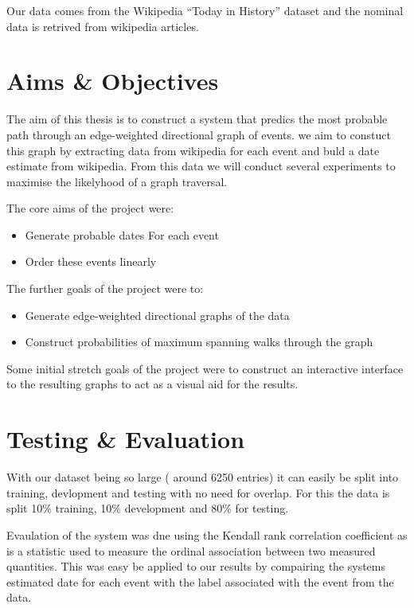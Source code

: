 \documentclass[bsc,frontabs,twoside,singlespacing,parskip,deptreport]{infthesis}     %
\begin{document}
Our data comes from the Wikipedia ``Today in History'' dataset and the nominal data is retrived
from wikipedia articles.

\section{Aims \& Objectives}
The aim of this thesis is to construct a system that predics the most probable path
through an edge-weighted directional graph of events.
we aim to constuct this graph by extracting data from wikipedia for each event and
buld a date estimate from wikipedia. From this data we will conduct several experiments
to maximise the likelyhood of a graph traversal.


The core aims of the project were: 
\begin{itemize}
  \item Generate probable dates For each event
  \item Order these events linearly
\end{itemize}

The further goals of the project were to:
\begin{itemize}
  \item Generate edge-weighted directional graphs of the data
  \item Construct probabilities of maximum spanning walks through the graph
\end{itemize}

Some initial stretch goals of the project were to construct an interactive
interface to the resulting graphs to act as a visual aid for the results.

\section{Testing \& Evaluation}
With our dataset being so large ( around 6250 entries) it can
easily be split into training, devlopment and testing with no
need for overlap. For this the data is split 10\% training,
10\% development and 80\% for testing.

Evaulation of the system was dne using the
Kendall rank correlation coefficient as is a statistic
used to measure the ordinal association between two
measured quantities. This was easy be applied to our results
by compairing the systems estimated date for each event
with the label associated with the event from the data.
\end{document}
